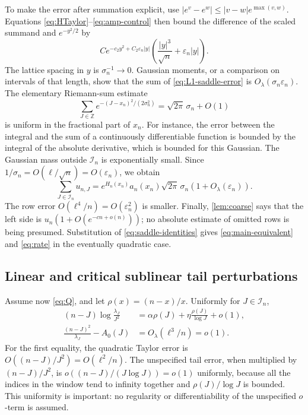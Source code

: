 \documentclass[11pt,a4paper]{article}
\theoremstyle{definition}
\newcommand{\Z}{\mathbb Z}
\newcommand{\epsn}{\varepsilon_n}
\numberwithin{equation}{section}
\begin{document}
To make the error after summation explicit, use
\(|e^v-e^w|\le |v-w|e^{\max(v,w)}\). Equations
\eqref{eq:HTaylor}--\eqref{eq:amp-control} then bound the difference of
the scaled summand and \(e^{-y^2/2}\) by
\begin{equation}
 C e^{-c_2y^2+C_2\epsn|y|}
          \left(\frac{|y|^3}{\sqrt n}+\epsn|y|\right).
 \label{eq:L1-saddle-error}
\end{equation}
The lattice spacing in \(y\) is \(\sigma_n^{-1}\to0\). Gaussian
moments, or a comparison on intervals of that length, show that the sum of
\eqref{eq:L1-saddle-error} is \(O_\lambda(\sigma_n\epsn)\).
The elementary Riemann-sum estimate
\begin{equation}
 \sum_{J\in\Z}e^{-(J-x_n)^2/(2\sigma_n^2)}
             =\sqrt{2\pi}\,\sigma_n+O(1)
 \label{eq:gaussian-sum}
\end{equation}
is uniform in the fractional part of \(x_n\). For instance, the error
between the integral and the sum of a continuously differentiable function
is bounded by the integral of the absolute derivative, which is bounded
for this Gaussian. The Gaussian mass outside \(\mathcal I_n\) is
exponentially small. Since \(1/\sigma_n=O(\ell/\sqrt n)=O(\epsn)\),
we obtain
\begin{equation}
 \sum_{J\in\mathcal I_n}u_{n,J}
 =e^{H_n(x_n)}a_n(x_n)\sqrt{2\pi}\,\sigma_n
                       \left(1+O_\lambda(\epsn)\right).
 \label{eq:sum-main}
\end{equation}
The row error \(O(\ell^4/n)=O(\epsn^2)\) is smaller. Finally,
\cref{lem:coarse} says that the left side is
\(u_n(1+O(e^{-c n+o(n)}))\); no absolute estimate of omitted rows is
being presumed. Substitution of \eqref{eq:saddle-identities} gives
\eqref{eq:main-equivalent} and \eqref{eq:rate} in the eventually
quadratic case.

\subsection{Linear and critical sublinear tail perturbations}
Assume now \eqref{eq:Q}, and let
\(\rho(x)=(n-x)/x\). Uniformly for \(J\in\mathcal I_n\),
\begin{align}
 (n-J)\log\frac{\lambda_J}{J^2}
   &=\alpha\rho(J)+\eta\frac{\rho(J)}{\log J}+o(1),
                                                   \label{eq:tail-expansion}\\
 \frac{(n-J)^2}{\lambda_J}-A_0(J)&=O_\lambda(\ell^3/n)=o(1).
                                                   \label{eq:A-perturb}
\end{align}
For the first equality, the quadratic Taylor error is
\(O((n-J)/J^2)=O(\ell^2/n)\). The unspecified tail error, when
multiplied by \((n-J)/J^2\), is
\(o((n-J)/(J\log J))=o(1)\) uniformly, because all the indices in the
window tend to infinity together and \(\rho(J)/\log J\) is bounded.
This uniformity is important: no regularity or differentiability of the
unspecified \(o\)-term is assumed.
\end{document}

